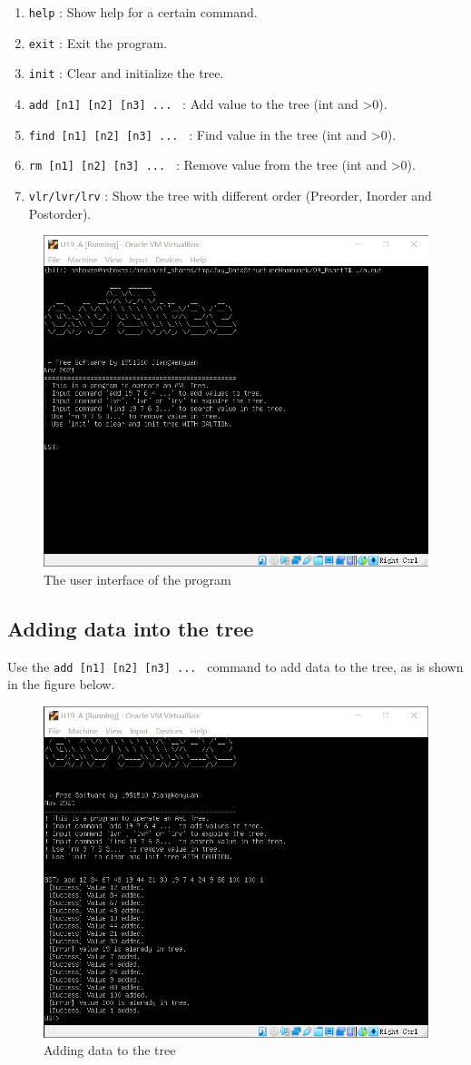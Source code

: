\documentclass[cn,black,12pt,normal]{elegantnote}
\begin{document}
\begin{enumerate}
    \item \lstinline{help} : Show help for a certain command.
    \item \lstinline{exit} : Exit the program.
    \item \lstinline{init} : Clear and initialize the tree.
    \item \lstinline{add [n1] [n2] [n3] ... } : Add value to the tree (int and >0).
    \item \lstinline{find [n1] [n2] [n3] ... } : Find value in the tree (int and >0).
    \item \lstinline{rm [n1] [n2] [n3] ... } : Remove value from the tree (int and >0).
    \item \lstinline{vlr/lvr/lrv} : Show the tree with different order (Preorder, Inorder and Postorder).
\end{enumerate}
\begin{figure}[H]
    \centering
    \includegraphics[width=0.7\linewidth]{image/avl_01.jpg}
    \caption{The user interface of the program}
\end{figure}



\subsection{Adding data into the tree}

Use the \lstinline{add [n1] [n2] [n3] ... } command to add data to the tree, as is shown in the figure below.
\begin{figure}[H]
    \centering
    \includegraphics[width=0.7\linewidth]{image/avl_02.jpg}
    \caption{Adding data to the tree}
\end{figure}
\end{document}
